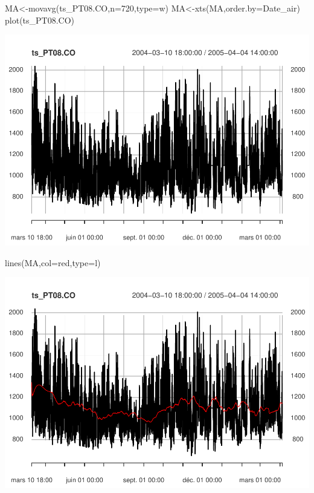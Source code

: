 \documentclass[
]{article}
\newenvironment{Shaded}{\begin{snugshade}}{\end{snugshade}}
\newcommand{\AttributeTok}[1]{\textcolor[rgb]{0.77,0.63,0.00}{#1}}
\newcommand{\DecValTok}[1]{\textcolor[rgb]{0.00,0.00,0.81}{#1}}
\newcommand{\FunctionTok}[1]{\textcolor[rgb]{0.00,0.00,0.00}{#1}}
\newcommand{\NormalTok}[1]{#1}
\newcommand{\OtherTok}[1]{\textcolor[rgb]{0.56,0.35,0.01}{#1}}
\newcommand{\StringTok}[1]{\textcolor[rgb]{0.31,0.60,0.02}{#1}}
\begin{document}
\begin{Shaded}
\begin{Highlighting}[]
\NormalTok{MA}\OtherTok{\textless{}{-}}\FunctionTok{movavg}\NormalTok{(ts\_PT08.CO,}\AttributeTok{n=}\DecValTok{720}\NormalTok{,}\AttributeTok{type=}\StringTok{\textquotesingle{}w\textquotesingle{}}\NormalTok{)}
\NormalTok{MA}\OtherTok{\textless{}{-}}\FunctionTok{xts}\NormalTok{(MA,}\AttributeTok{order.by=}\NormalTok{Date\_air)}
\FunctionTok{plot}\NormalTok{(ts\_PT08.CO)}
\end{Highlighting}
\end{Shaded}

\includegraphics{STA202_report_files/figure-latex/unnamed-chunk-7-1.pdf}

\begin{Shaded}
\begin{Highlighting}[]
\FunctionTok{lines}\NormalTok{(MA,}\AttributeTok{col=}\StringTok{\textquotesingle{}red\textquotesingle{}}\NormalTok{,}\AttributeTok{type=}\StringTok{\textquotesingle{}l\textquotesingle{}}\NormalTok{)}
\end{Highlighting}
\end{Shaded}

\includegraphics{STA202_report_files/figure-latex/unnamed-chunk-7-2.pdf}
\end{document}
